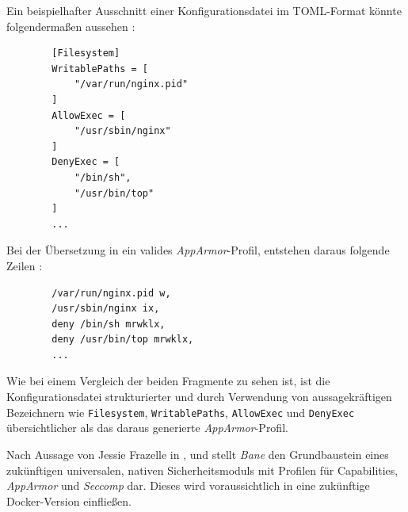 \documentclass[../main.tex]{subfiles}
\begin{document}
      Ein beispielhafter Ausschnitt einer Konfigurationsdatei im \acrshort{TOML}-Format könnte folgendermaßen aussehen \cite{githubBaneTOML}:

      \begin{lstlisting}
        [Filesystem]
        WritablePaths = [
        	"/var/run/nginx.pid"
        ]
        AllowExec = [
        	"/usr/sbin/nginx"
        ]
        DenyExec = [
        	"/bin/sh",
        	"/usr/bin/top"
        ]
        ...
      \end{lstlisting}

      Bei der Übersetzung in ein valides \emph{AppArmor}-Profil, entstehen daraus folgende Zeilen \cite{githubBaneAppArmorSample}:

      \begin{lstlisting}
        /var/run/nginx.pid w,
        /usr/sbin/nginx ix,
        deny /bin/sh mrwklx,
        deny /usr/bin/top mrwklx,
        ...
      \end{lstlisting}

      Wie bei einem Vergleich der beiden Fragmente zu sehen ist, ist die Konfigurationsdatei strukturierter und durch Verwendung von aussagekräftigen Bezeichnern wie \texttt{Filesystem}, \texttt{WritablePaths}, \texttt{AllowExec} und \texttt{DenyExec} übersichtlicher als das daraus generierte \emph{AppArmor}-Profil.

      Nach Aussage von Jessie Frazelle in
      \cite{githubBane}, \cite{githubGeneralSecProfiles}
      und \cite{docker110Security} stellt \emph{Bane} den Grundbaustein eines zukünftigen universalen, nativen Sicherheitsmoduls mit Profilen für Capabilities, \emph{AppArmor} und \emph{Seccomp} dar. Dieses wird voraussichtlich in eine zukünftige Docker-Version einfließen.
\end{document}
